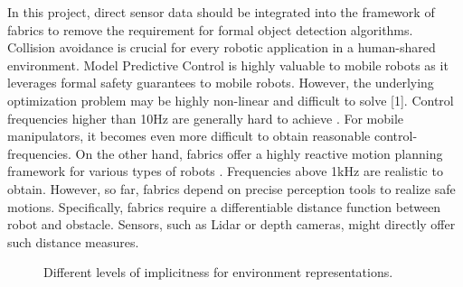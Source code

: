 In this project, direct sensor data should be integrated into
the framework of \ac{fabrics} to remove the requirement for formal
object detection algorithms. Collision avoidance is crucial for every robotic
application in a human-shared environment. Model Predictive Control is highly
valuable to mobile robots as it leverages formal safety guarantees to mobile
robots. However, the underlying optimization problem may be highly non-linear
and difficult to solve [1]. Control frequencies higher than 10Hz are generally
hard to achieve \cite{hewing_learning-based_2020}. For mobile manipulators, it
becomes even more difficult to obtain reasonable control-frequencies. On the
other hand, \ac{fabrics} offer a highly reactive motion planning
framework for various types of robots \cite{Ratliff2021}.
Frequencies above 1kHz are realistic to obtain. However, so far, \ac{fabrics}
depend on precise perception tools to realize safe motions.
Specifically, \ac{fabrics} require a differentiable distance function
between robot and obstacle. Sensors, such as Lidar or depth cameras, might
directly offer such distance measures. 


\begin{figure}
  \centering
  
  \caption{Different levels of implicitness for environment representations.}
  \label{fig:overview}
\end{figure}


